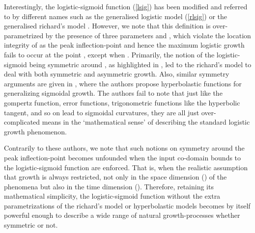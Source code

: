 \documentclass[journal]{IEEEtran}
\theoremstyle{plain}
\theoremstyle{definition}
\theoremstyle{remark}
\begin{document}
Interestingly, the logistic-sigmoid function (\ref{lsig}) has been modified and referred to by different names such as the generalised logistic model (\ref{rlsig}) or the generalised richard's model \cite{wuGeneralizedLogisticGrowth2020}. However, we note that this definition is over-parametrized by the presence of three parameters  and , which violate the location integrity of  as the peak inflection-point and hence the maximum logistic growth fails to occur at the point , except when .  Primarily, the notion of the logistic-sigmoid being symmetric around , as highlighted in \cite{yinFlexibleSigmoidFunction2003,loibelInferenceRichardsGrowth2006}, led to the richard's model to deal with both symmetric and asymmetric growth. Also, similar symmetry arguments are given in \cite{tabatabaiHyperbolasticGrowthModels2005}, where the authors propose hyperbolastic functions for generalizing sigmoidal growth. The authors fail to note that just like the gompertz function, error functions, trigonometric functions like the hyperbolic tangent, and so on lead to sigmoidal curvatures, they are all just over-complicated means in the `mathematical sense' of describing the standard logistic growth phenomenon.

Contrarily to these authors, we note that such notions on symmetry around the peak inflection-point becomes unfounded when the input co-domain bounds to the logistic-sigmoid function are enforced.
That is, when the realistic assumption that growth is always restricted, not only in the space dimension () of the phenomena but also in the time dimension (). Therefore, retaining its mathematical simplicity, the logistic-sigmoid function without the extra parametrizations of the richard's model or hyperbolastic models becomes by itself powerful enough to describe a wide range of natural growth-processes whether symmetric or not.
\end{document}
